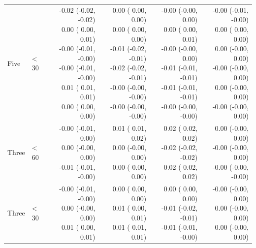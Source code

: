 \documentclass[12pt,PhD,twoside,openright]{muthesis}
\begin{document}
\begin{table}[!h]
\begin{tabular}[t]{>{}l>{}l>{\ttfamily}r>{\ttfamily}r>{\ttfamily}r>{\ttfamily}r}
\hspace{1em}Five & < 30 & \makecell[r]{-0.02 (-0.02, -0.02)\\  0.00 ( 0.00,  0.01)\\ -0.00 (-0.01, -0.00)\\ -0.00 (-0.01, -0.00)\\  0.01 ( 0.01,  0.01)\\  0.00 ( 0.00,  0.00)} & \makecell[r]{0.00 ( 0.00,  0.00)\\  0.00 ( 0.00,  0.00)\\ -0.01 (-0.02, -0.01)\\ -0.02 (-0.02, -0.01)\\ -0.00 (-0.00, -0.00)\\ -0.00 (-0.00, -0.00)} & \makecell[r]{-0.00 (-0.00,  0.00)\\  0.00 ( 0.00,  0.01)\\ -0.00 (-0.00,  0.00)\\ -0.01 (-0.01, -0.01)\\ -0.01 (-0.01, -0.01)\\ -0.00 (-0.00, -0.00)} & \makecell[r]{-0.00 (-0.01, -0.00)\\  0.00 ( 0.00,  0.00)\\  0.00 (-0.00,  0.00)\\ -0.00 (-0.00,  0.00)\\  0.00 (-0.00,  0.00)\\ -0.00 (-0.00,  0.00)}\\
\rowcolor{gray!6}  \hspace{1em}Three & < 60 & \makecell[r]{-0.00 (-0.01, -0.00)\\  0.00 (-0.00,  0.00)\\ -0.01 (-0.01, -0.00)} & \makecell[r]{0.01 ( 0.01,  0.02)\\  0.00 (-0.00,  0.00)\\  0.00 ( 0.00,  0.00)} & \makecell[r]{0.02 ( 0.02,  0.02)\\ -0.02 (-0.02, -0.02)\\  0.02 ( 0.02,  0.02)} & \makecell[r]{0.00 (-0.00,  0.00)\\ -0.00 (-0.00,  0.00)\\ -0.00 (-0.00, -0.00)}\\
\hspace{1em}Three & < 30 & \makecell[r]{-0.00 (-0.01, -0.00)\\  0.00 (-0.00,  0.00)\\  0.01 ( 0.00,  0.01)} & \makecell[r]{0.00 ( 0.00,  0.00)\\  0.01 ( 0.00,  0.01)\\  0.01 ( 0.01,  0.01)} & \makecell[r]{0.00 ( 0.00,  0.00)\\ -0.01 (-0.02, -0.01)\\ -0.01 (-0.01, -0.00)} & \makecell[r]{-0.00 (-0.00,  0.00)\\  0.00 (-0.00,  0.00)\\  0.00 (-0.00,  0.00)}\\

\end{tabular}
\end{table}
\end{document}
